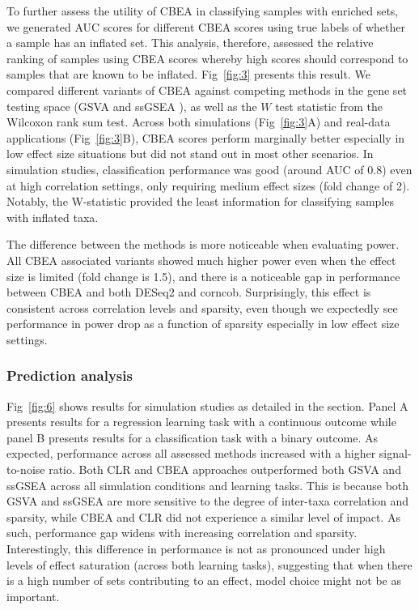\documentclass{article}
\begin{document}
To further assess the utility of CBEA in classifying samples with enriched sets, we generated AUC scores for different CBEA scores using true labels of whether a sample has an inflated set. This analysis, therefore, assessed the relative ranking of samples using CBEA scores whereby high scores should correspond to samples that are known to be inflated. Fig~\ref{fig:3} presents this result. We compared different variants of CBEA against competing methods in the gene set testing space (GSVA \cite{hanzelmann2013} and ssGSEA \cite{barbie2009}), as well as the $W$ test statistic from the Wilcoxon rank sum test. Across both simulations (Fig~\ref{fig:3}A) and real-data applications (Fig~\ref{fig:3}B), CBEA scores perform marginally better especially in low effect size situations but did not stand out in most other scenarios. In simulation studies, classification performance was good (around AUC of 0.8) even at high correlation settings, only requiring medium effect sizes (fold change of 2). Notably, the W-statistic provided the least information for classifying samples with inflated taxa.


The difference between the methods is more noticeable when evaluating power. All CBEA associated variants showed much higher power even when the effect size is limited (fold change is 1.5), and there is a noticeable gap in performance between CBEA and both DESeq2 and corncob. Surprisingly, this effect is consistent across correlation levels and sparsity, even though we expectedly see performance in power drop as a function of sparsity especially in low effect size settings.  

\subsubsection{Prediction analysis}
Fig~\ref{fig:6} shows results for simulation studies as detailed in the  section. Panel A presents results for a regression learning task with a continuous outcome while panel B presents results for a classification task with a binary outcome. As expected, performance across all assessed methods increased with a higher signal-to-noise ratio. Both CLR and CBEA approaches outperformed both GSVA and ssGSEA across all simulation conditions and learning tasks. This is because both GSVA and ssGSEA are more sensitive to the degree of inter-taxa correlation and sparsity, while CBEA and CLR did not experience a similar level of impact. As such, performance gap widens with increasing correlation and sparsity. Interestingly, this difference in performance is not as pronounced under high levels of effect saturation (across both learning tasks), suggesting that when there is a high number of sets contributing to an effect, model choice might not be as important.   
\end{document}
